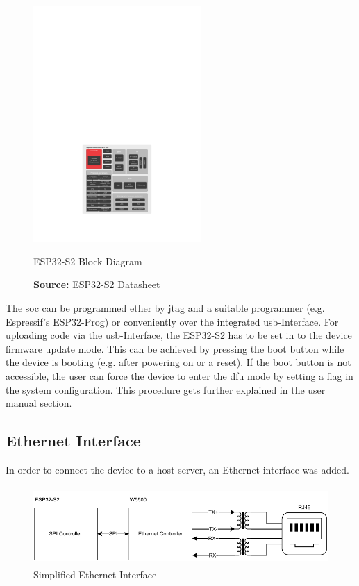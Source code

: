 \begin{figure}[h!]
	\centering
	\includegraphics[height=9cm]{images/esp32-s2_block_diagram}
	\caption{ESP32-S2 Block Diagram}
	\vspace{-1.4ex}
	\caption*{\textbf{Source:} ESP32-S2 Datasheet \cite{esp32-s2_datasheet}}
	\label{fig:esp32-s2_block_diagram}
\end{figure}

The \acrshort{soc} can be programmed ether by \acrshort{jtag} and a suitable programmer (e.g. Espressif's ESP32-Prog) or conveniently over the integrated \acrshort{usb}-Interface.\newline
For uploading code via the \acrshort{usb}-Interface, the ESP32-S2 has to be set in to the device firmware update mode. This can be achieved by pressing the boot button while the device is booting (e.g. after powering on or a reset). If the boot button is not accessible, the user can force the device to enter the \acrshort{dfu} mode by setting a flag in the system configuration. This procedure gets further explained in the user manual section.
\newpage

\subsection{Ethernet Interface}
In order to connect the device to a host server, an Ethernet interface was added.

\begin{figure}[h!]
	\centering
	\includegraphics[height=3.0cm]{images/eth_interface}
	\vspace{0.2cm}
	\caption{Simplified Ethernet Interface}
	\label{fig:eth-interface}
\end{figure}

